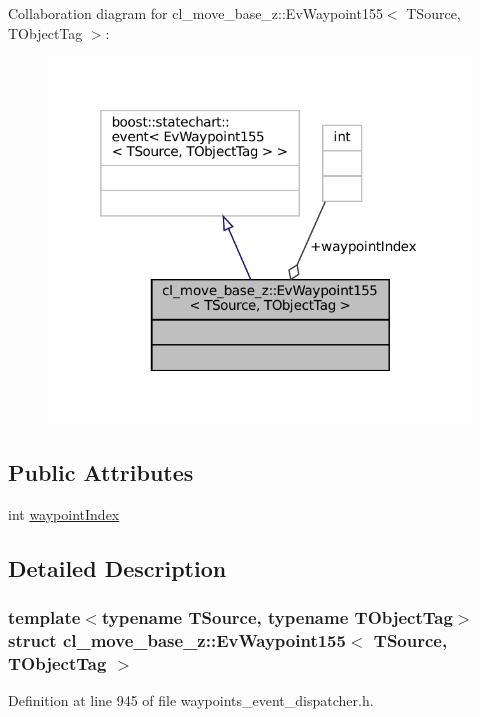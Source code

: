 Collaboration diagram for cl\+\_\+move\+\_\+base\+\_\+z\+:\+:Ev\+Waypoint155$<$ T\+Source, T\+Object\+Tag $>$\+:
\nopagebreak
\begin{figure}[H]
\begin{center}
\leavevmode
\includegraphics[width=319pt]{structcl__move__base__z_1_1EvWaypoint155__coll__graph}
\end{center}
\end{figure}
\subsection*{Public Attributes}
\begin{DoxyCompactItemize}
\item 
int \hyperlink{structcl__move__base__z_1_1EvWaypoint155_a54a6ec73df7b66c8995dca4bec3bef44}{waypoint\+Index}
\end{DoxyCompactItemize}


\subsection{Detailed Description}
\subsubsection*{template$<$typename T\+Source, typename T\+Object\+Tag$>$\newline
struct cl\+\_\+move\+\_\+base\+\_\+z\+::\+Ev\+Waypoint155$<$ T\+Source, T\+Object\+Tag $>$}



Definition at line 945 of file waypoints\+\_\+event\+\_\+dispatcher.\+h.



